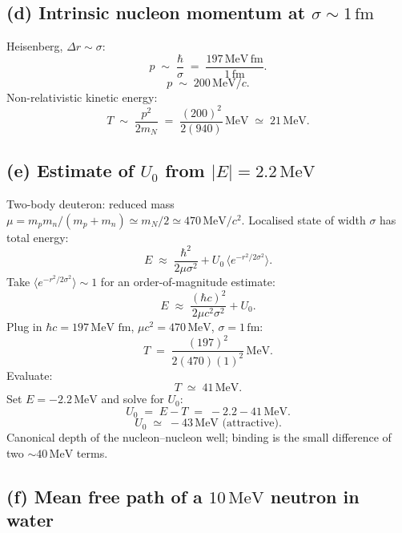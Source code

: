 \documentclass[11pt]{article}
\begin{document}
\subsection*{(d) Intrinsic nucleon momentum at $\sigma\sim 1\,\text{fm}$}

Heisenberg, $\Delta r\sim\sigma$:
\[
p\;\sim\;\frac{\hbar}{\sigma}\;=\;\frac{197\,\text{MeV}\,\text{fm}}{1\,\text{fm}}.
\]
\begin{equation}
\boxed{\;p\;\sim\;200\,\text{MeV}/c.\;}
\end{equation}
Non-relativistic kinetic energy:
\[
T\;\sim\;\frac{p^{2}}{2m_{N}}\;=\;\frac{(200)^{2}}{2(940)}\,\text{MeV}\;\simeq\;21\,\text{MeV}.
\]

\subsection*{(e) Estimate of $U_{0}$ from $|E|=2.2\,\text{MeV}$}

Two-body deuteron: reduced mass $\mu=m_{p}m_{n}/(m_{p}+m_{n})\simeq m_{N}/2\simeq 470\,\text{MeV}/c^{2}$. Localised state of width $\sigma$ has total energy:
\[
E\;\approx\;\frac{\hbar^{2}}{2\mu\sigma^{2}}+U_{0}\,\langle e^{-r^{2}/2\sigma^{2}}\rangle.
\]
Take $\langle e^{-r^{2}/2\sigma^{2}}\rangle\sim 1$ for an order-of-magnitude estimate:
\[
E\;\approx\;\frac{(\hbar c)^{2}}{2\mu c^{2}\sigma^{2}}+U_{0}.
\]
Plug in $\hbar c=197\,\text{MeV fm}$, $\mu c^{2}=470\,\text{MeV}$, $\sigma=1\,\text{fm}$:
\[
T\;=\;\frac{(197)^{2}}{2(470)(1)^{2}}\,\text{MeV}.
\]
Evaluate:
\[
T\;\simeq\;41\,\text{MeV}.
\]
Set $E=-2.2\,\text{MeV}$ and solve for $U_{0}$:
\[
U_{0}\;=\;E-T\;=\;-2.2-41\,\text{MeV}.
\]
\begin{equation}
\boxed{\;U_{0}\;\simeq\;-43\,\text{MeV (attractive)}.\;}
\end{equation}
Canonical depth of the nucleon--nucleon well; binding is the small difference of two ${\sim}40\,\text{MeV}$ terms.

\subsection*{(f) Mean free path of a $10\,\text{MeV}$ neutron in water}
\end{document}
